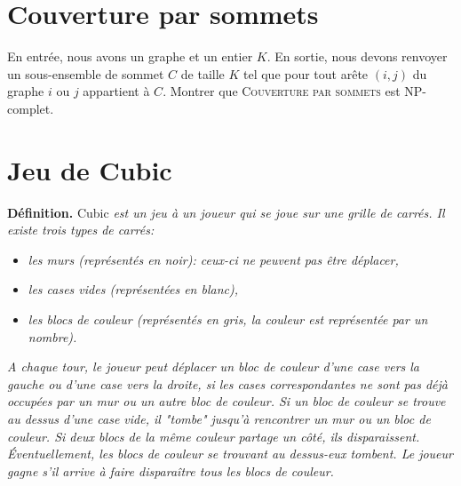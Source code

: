 \documentclass[12pt]{article}
\begin{document}
%

%
\section{Couverture par sommets}
En entrée, nous avons un graphe et un entier $K$. En sortie, nous devons renvoyer un sous-ensemble de sommet 
$C$ de taille $K$ tel que pour tout arête $(i,j)$ du graphe $i$ ou $j$ appartient à $C$.
Montrer que \textsc{Couverture par sommets} est NP-complet.

%
%


\section{Jeu de Cubic}
\noindent \textbf{Définition.} Cubic \textit{est un jeu à un joueur qui se joue sur une grille de carrés. Il existe trois types de carrés:}
\begin{itemize}
\item \textit{les murs (représentés en noir): ceux-ci ne peuvent pas être déplacer,}
\item \textit{les cases vides (représentées en blanc),}
\item \textit{les blocs de couleur (représentés en gris, la couleur est représentée par un nombre).}
\end{itemize}
\textit{A chaque tour, le joueur peut déplacer un bloc de couleur d'une case vers la gauche ou d'une case vers la droite, si les cases correspondantes ne sont pas déjà occupées par un mur ou un autre bloc de couleur. Si un bloc de couleur se trouve au dessus d'une case vide, il "tombe" jusqu'à rencontrer un mur ou un bloc de couleur. Si deux blocs de la même couleur partage un côté, ils disparaissent. Éventuellement, les blocs de couleur se trouvant au dessus-eux tombent. Le joueur gagne s'il arrive à faire disparaître tous les blocs de couleur.}
\end{document}
